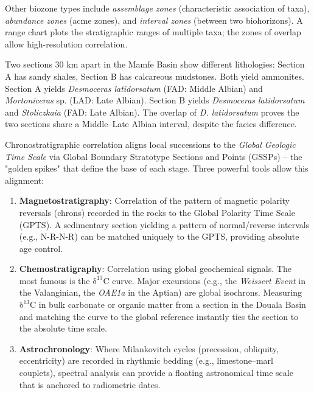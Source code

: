 \documentclass[11pt]{article}
\newcommand{\cle}[1]{{\popxbold\color{popdark}#1}}
\newcounter{popsec}
\newcounter{popsub}
\newcommand{\courssub}[1]{%
  \stepcounter{popsub}%
  \par\vspace{9pt}\noindent{\popxbold\fontsize{11.5}{13}\selectfont\color{popink}{\color{poporange}\thepopsec.\thepopsub}\hspace{6pt}#1}\par\nopagebreak\vspace{4pt}
}
\begin{document}
Other biozone types include \emph{assemblage zones} (characteristic association of taxa), \emph{abundance zones} (acme zones), and \emph{interval zones} (between two biohorizons). A \cle{range chart} plots the stratigraphic ranges of multiple taxa; the zones of overlap allow high-resolution correlation.

\begin{exemplebox}
Two sections 30 km apart in the Mamfe Basin show different lithologies: Section A has sandy shales, Section B has calcareous mudstones. Both yield ammonites. Section A yields \emph{Desmoceras latidorsatum} (FAD: Middle Albian) and \emph{Mortoniceras} sp. (LAD: Late Albian). Section B yields \emph{Desmoceras latidorsatum} and \emph{Stoliczkaia} (FAD: Late Albian). The overlap of \emph{D. latidorsatum} proves the two sections share a Middle--Late Albian interval, despite the facies difference.
\end{exemplebox}

\courssub{Chronostratigraphic Correlation}

Chronostratigraphic correlation aligns local successions to the \emph{Global Geologic Time Scale} via \cle{Global Boundary Stratotype Sections and Points (GSSPs)} -- the "golden spikes" that define the base of each stage. Three powerful tools allow this alignment:

\begin{enumerate}
\item \textbf{Magnetostratigraphy}: Correlation of the pattern of magnetic polarity reversals (chrons) recorded in the rocks to the Global Polarity Time Scale (GPTS). A sedimentary section yielding a pattern of normal/reverse intervals (e.g., N-R-N-R) can be matched uniquely to the GPTS, providing absolute age control.
\item \textbf{Chemostratigraphy}: Correlation using global geochemical signals. The most famous is the \ensuremath{\mathrm{\delta^{13}C}} curve. Major excursions (e.g., the \emph{Weissert Event} in the Valanginian, the \emph{OAE1a} in the Aptian) are global isochrons. Measuring \ensuremath{\mathrm{\delta^{13}C}} in bulk carbonate or organic matter from a section in the Douala Basin and matching the curve to the global reference instantly ties the section to the absolute time scale.
\item \textbf{Astrochronology}: Where Milankovitch cycles (precession, obliquity, eccentricity) are recorded in rhythmic bedding (e.g., limestone--marl couplets), spectral analysis can provide a floating astronomical time scale that is anchored to radiometric dates.
\end{enumerate}
\end{document}
